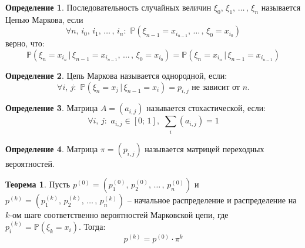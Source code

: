 \documentclass[12pt]{article}
\theoremstyle{definition}
\newtheorem{theorem}{Теорема}[section]
\newtheorem{definition}{Определение}
\newcommand{\prob}{\mathbb{P}}
\begin{document}
\begin{definition}
    Последовательность случайных величин $\xi_0,\,\xi_1,\,\ldots\,,\,\xi_n$ называется Цепью Маркова, если 
    $$\forall n,\,i_0,\,i_1,\,\ldots\,,\,i_n:\,\,\prob(\xi_{n-1}=x_{i_{n-1}},\,\ldots\,,\,\xi_0=x_{i_{0}})$$
    верно, что:
    $$\prob(\xi_{n}=x_{i_{n}}\,|\,\xi_{n-1}=x_{i_{n-1}},\,\ldots\,,\,\xi_0=x_{i_{0}})=\prob(\xi_{n}=x_{i_{n}}\,|\,\xi_{n-1}=x_{i_{n-1}})$$
\end{definition}
\begin{definition}
    Цепь Маркова называется однородной, если:
    $$\forall i,\,j:\,\,\prob(\xi_n=x_j\,|\,\xi_{n-1}=x_i)=p_{i,j}\text{ не зависит от }n.$$
\end{definition}
\begin{definition}
    Матрица $A=(a_{i,j})$ называется стохастической, если:
    $$\forall i,\,j:\,\,a_{i,j}\in [0;\,1],\,\,\sum_{i}(a_{i,j})=1$$
\end{definition}
\begin{definition}
    Матрица $\pi=(p_{i,j})$ называется матрицей переходных вероятностей.
\end{definition}
\begin{theorem}
    Пусть $p^{(0)}=(p^{(0)}_1,\,p^{(0)}_2,\,\ldots\,,\,p^{(0)}_n)$ и $p^{(k)}=(p^{(k)}_1,\,p^{(k)}_2,\,\ldots\,,\,p^{(k)}_n)$ -- начальное распределение и распределение на $k$-ом шаге соответственно вероятностей Марковской цепи, где $p^{(k)}_i=\prob(\xi_k=x_i)$. Тогда:
    $$p^{(k)}=p^{(0)}\cdot\pi^k$$
\end{theorem}
\end{document}
